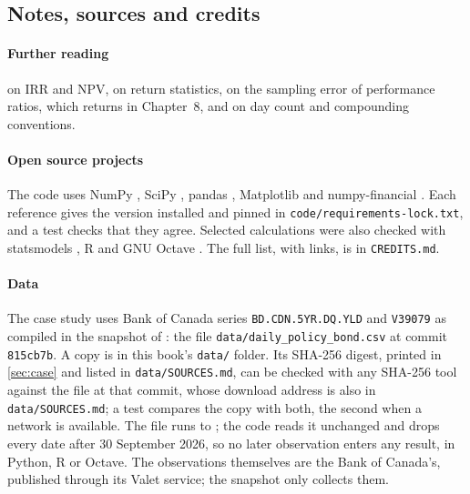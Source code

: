 \begin{chapterrefs}
\FloatBarrier
\section{Notes, sources and credits}
\label{sec:credits}

\paragraph{Further reading} \textcite{brealey2020} on IRR and NPV, \textcite{campbell1997} on
return statistics, \textcite{lo2002} on the sampling error of performance ratios, which returns in
Chapter~8, and \textcite{hull2022} on day count and compounding conventions.

\paragraph{Open source projects}
The code uses NumPy \parencite{numpy}, SciPy \parencite{scipy}, pandas \parencite{pandas}, Matplotlib
\parencite{matplotlib} and numpy-financial \parencite{numpyfinancial}. Each reference gives the version
installed and pinned in \texttt{code/requirements-lock.txt}, and a test checks that they agree. Selected calculations were also checked with statsmodels
\parencite{statsmodels}, R \parencite{rcore} and GNU Octave \parencite{octave}. The full list, with
links, is in \texttt{CREDITS.md}.

\paragraph{Data}
The case study uses Bank of Canada series \texttt{BD.CDN.5YR.DQ.YLD} and \texttt{V39079} as compiled in the snapshot of \textcite{khan2026policy}: the file \texttt{data/daily\_policy\_bond.csv}
at commit \texttt{815cb7b}. A copy is in this book's \texttt{data/} folder. Its SHA-256 digest, printed in
\cref{sec:case} and listed in \texttt{data/SOURCES.md}, can be checked with any SHA-256 tool
against the file at that commit, whose download address is also in \texttt{data/SOURCES.md}; a test
compares the copy with both, the second when a network is available. The file runs to \gocFileEnd;
the code reads it unchanged and drops every date after 30 September 2026, so no later observation
enters any result, in Python, R or Octave. The
observations themselves are the Bank of Canada's, published through its Valet service; the snapshot
only collects them.

\end{chapterrefs}
